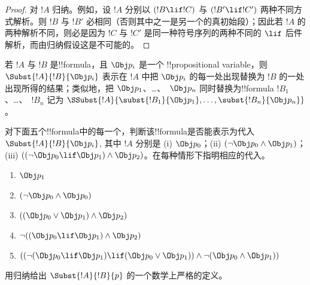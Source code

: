 \documentclass[../../../include/open-logic-section]{subfiles}
\begin{document}
\begin{proof}
对 $!A$ 归纳。例如，设 $!A$ 分别以 $(!B \lif !C)$ 与 $(!B' \lif !C')$ 两种不同方式解析。则 $!B$ 与 $!B'$ 必相同（否则其中之一是另一个的真初始段）；因此若 $!A$ 的两种解析不同，则必是因为 $!C$ 与 $!C'$ 是同一种符号序列的两种不同的 $\lif$ 后件解析，而由归纳假设这是不可能的。
\end{proof}


\begin{defn}[统一代入]
若 $!A$ 与 $!B$ 是!!{formula}，且 $\Obj p_i$ 是一个 !!{propositional
variable}，则 $\Subst{!A}{!B}{\Obj p_i}$ 表示在 $!A$ 中把 $\Obj p_i$ 的每一处出现替换为 $!B$ 的一处出现所得的结果；类似地，把 $\Obj p_1$、\dots、~$\Obj p_n$ 同时替换为!!{formula} $!B_1$、\dots、~$!B_n$ 记为
$\SSubst{!A}{\subst{!B_1}{\Obj p_1},\dots,\subst{!B_n}{\Obj p_n}}$。
\end{defn}

\begin{prob} 对下面五个!!{formula}中的每一个，判断该!!{formula}是否能表示为代入 \( \Subst{!A}{!B}{\Obj p_i} \),
 其中 \( !A \) 分别是 (i) \( \Obj p_0 \)；(ii) \( ( \lnot \Obj p_0 \land \Obj
 p_1) \)；(iii) \( ( ( \lnot \Obj p_0 \lif \Obj p_1 ) \land \Obj
 p_2 ) \)。在每种情形下指明相应的代入。
  \begin{enumerate}
    \item \( \Obj p_1 \)
    \item \( ( \lnot \Obj p_0 \land \Obj p_0 ) \)
    \item \( ( ( \Obj p_0 \lor \Obj p_1 ) \land \Obj p_2 )  \)
    \item \( \lnot ( ( \Obj p_0 \lif \Obj p_1 ) \land \Obj p_2 ) \)
    \item \( (( \lnot ( \Obj p_0 \lif \Obj p_1 ) \lif ( \Obj p_0 \lor \Obj p_1 )) \land \lnot ( \Obj p_0 \land \Obj p_1 )) \)
  \end{enumerate}
\end{prob}

\begin{prob}
用归纳给出 $\Subst{!A}{!B}{p}$ 的一个数学上严格的定义。
\end{prob}
\end{document}
